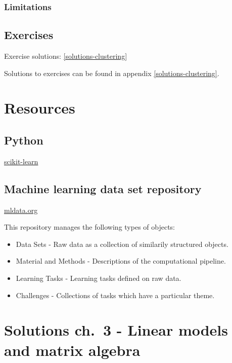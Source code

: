\documentclass[]{book}
\providecommand{\tightlist}{%
  \setlength{\itemsep}{0pt}\setlength{\parskip}{0pt}}
\theoremstyle{definition}
\theoremstyle{definition}
\theoremstyle{definition}
\theoremstyle{remark}
\begin{document}
\subsection{Limitations}\label{limitations}

\section{Exercises}\label{exercises-7}

Exercise solutions: \ref{solutions-clustering}

Solutions to exercises can be found in appendix
\ref{solutions-clustering}.

\appendix


\chapter{Resources}\label{resources}

\section{Python}\label{python}

\href{http://scikit-learn.org}{scikit-learn}

\section{Machine learning data set
repository}\label{machine-learning-data-set-repository}

\href{http://mldata.org/}{mldata.org}

This repository manages the following types of objects:

\begin{itemize}
\tightlist
\item
  Data Sets - Raw data as a collection of similarily structured objects.
\item
  Material and Methods - Descriptions of the computational pipeline.
\item
  Learning Tasks - Learning tasks defined on raw data.
\item
  Challenges - Collections of tasks which have a particular theme.
\end{itemize}

\chapter{Solutions ch.~3 - Linear models and matrix
algebra}\label{solutions-linear-models}
\end{document}
